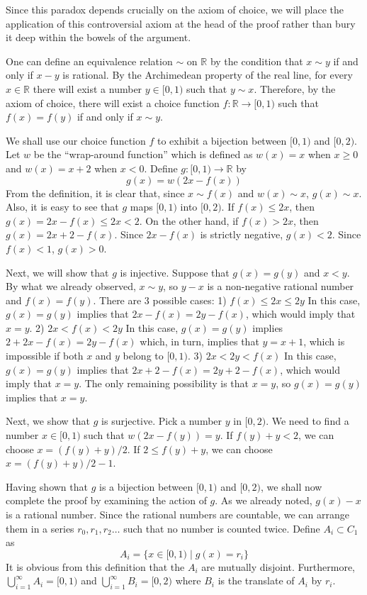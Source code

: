 \documentclass[12pt]{article}
\begin{document}
Since this paradox depends crucially on the axiom of choice, we will
place the application of this controversial axiom at the head of the
proof rather than bury it deep within the bowels of the argument.

One can define an equivalence relation $\sim$ on $\mathbb{R}$ by the
condition that $x \sim y$ if and only if $x - y$ is rational.  By
the Archimedean property of the real line, for every $x \in \mathbb{R}$ there will exist a number $y \in [0,1)$ such that $y \sim x$.
Therefore, by the axiom of choice, there will exist a choice
function $f \colon \mathbb{R} \to [0,1)$ such that $f(x) = f(y)$ if
and only if $x \sim y$.

We shall use our choice function $f$ to exhibit a bijection between
$[0,1)$ and $[0,2)$.  Let $w$ be the ``wrap-around function'' which
is defined as $w(x) = x$ when $x \ge 0$ and $w(x) = x + 2$ when $x <
0$.  Define $g \colon [0,1) \to \mathbb{R}$ by
 $$g(x) = w(2x - f(x))$$
From the definition, it is clear that, since $x \sim f(x)$ and $w(x)
\sim x$, $g(x) \sim x$.  Also, it is easy to see that $g$ maps
$[0,1)$ into $[0,2)$.  If $f(x) \le 2x$, then $g(x) = 2x - f(x) \le
2x < 2$.  On the other hand, if $f(x) > 2x$, then $g(x) = 2x + 2 -
f(x)$.  Since $2x - f(x)$ is strictly negative, $g(x) < 2$.  Since
$f(x) < 1$, $g(x) > 0$.

Next, we will show that $g$ is injective.  Suppose that $g(x) =
g(y)$ and $x < y$.  By what we already observed, $x \sim y$, so $y -
x$ is a non-negative rational number and $f(x) = f(y)$.  There are 3
possible cases: 1) $f(x) \le 2x \le 2y$  In this case, $g(x) = g(y)$
implies that $2x - f(x) = 2y - f(x)$, which would imply that $x =
y$. 2) $2x < f(x) < 2y$  In this case, $g(x) = g(y)$ implies $2 + 2x
- f(x) = 2y - f(x)$ which, in turn, implies that $y = x + 1$, which
is impossible if both $x$ and $y$ belong to $[0,1)$.  3) $2x < 2y <
f(x)$ In this case, $g(x) = g(y)$ implies that $2x + 2 - f(x) = 2y +
2 - f(x)$, which would imply that $x = y$.  The only remaining
possibility is that $x=y$, so $g(x) = g(y)$ implies that $x = y$.

Next, we show that $g$ is surjective.  Pick a number $y$ in $[0,2)$.
We need to find a number $x \in [0,1)$ such that $w(2x - f(y)) = y$.
If $f(y) + y < 2$, we can choose $x = (f(y) + y)/2$.  If $2 \le f(y)
+ y$, we can choose $x = (f(y) + y)/2 - 1$.

Having shown that $g$ is a bijection between $[0,1)$ and $[0,2)$, we
shall now complete the proof by examining the action of $g$.  As we
already noted, $g(x) - x$ is a rational number.   Since the rational
numbers are countable, we can arrange them in a series $r_0, r_1,
r_2 \ldots$ such that no number is counted twice.  Define $A_i
\subset C_1$ as
 $$A_i = \{ x \in [0,1) \mid g(x) = r_i \}$$
It is obvious from this definition that the $A_i$ are mutually
disjoint.  Furthermore, $\bigcup_{i=1}^\infty A_i = [0,1)$ and
$\bigcup_{i=1}^\infty B_i = [0,2)$ where $B_i$ is the translate of
$A_i$ by $r_i$.
\end{document}
